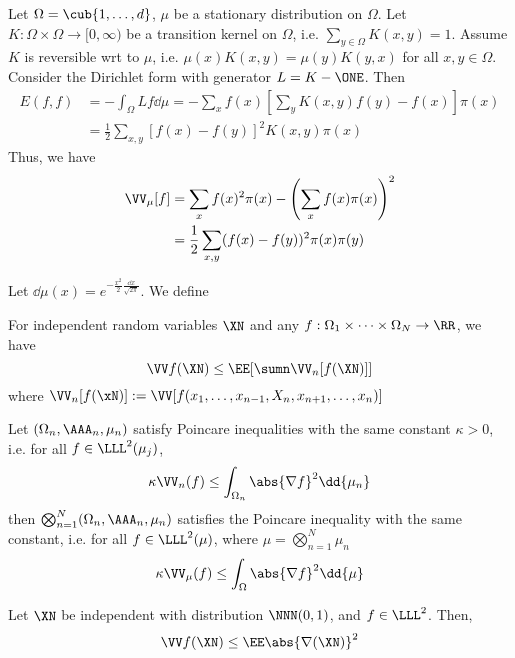 \begin{exm}
    Let $\Omega = \cub{1,\dots, d}$, $\mu$ be a stationary distribution on $\Omega$. Let $K:\Omega \times \Omega \to [0,\infty)$ be a transition kernel on $\Omega$, i.e. $\sum_{y\in \Omega}K(x,y)=1$. Assume $K$ is reversible wrt to $\mu$, i.e. $\mu(x)K(x,y) = \mu(y)K(y,x)$ for all $x,y \in \Omega$. Consider the Dirichlet form with generator $L=K-\ONE$. Then
    \begin{align*}
        E(f,f) &= -\int_\Omega Lf \dd{\mu} = - \sum_{x} f(x) \left[\sum_{y}K(x,y) f(y)-f(x)\right] \pi(x) \\
        &=\frac{1}{2} \sum_{x,y} \left[f(x)-f(y)\right]^2 K(x,y)\pi(x)
    \end{align*}
    Thus, we have 
    \begin{align*}
        \VV_\mu[f] &=\sum_x f(x)^2 \pi(x) - \left(\sum_x f(x) \pi(x)\right)^2 \\
        &= \frac{1}{2} \sum_{x,y} (f(x)-f(y))^2 \pi(x)\pi(y)
    \end{align*}
\end{exm}


\begin{exm}
    Let $\dd{\mu(x)} = e^{-\frac{x^2}{2}\frac{\dd{x}}{\sqrt{2\pi}}}$. We define 
\end{exm}


\begin{thm}
    For independent random variables $\XN$ and any $f: \Omega_1 \times \dots \times \Omega_N \to \RR$, we have 
    $$\VV f(\XN) \leq \EE[\sumn  \VV_n[f(\XN)]]$$
    where $\VV_n[f(\xN)]:= \VV[f(x_1,\dots,x_{n-1},X_n,x_{n+1}, \dots ,x_n)]$
\end{thm}


\begin{thm}
    Let $(\Omega_n,\AAA_n, \mu_n)$ satisfy Poincare inequalities with the same constant $\kappa>0$, i.e. for all $f\in \LLL^2(\mu_j)$, 
    $$\kappa \VV_n(f) \leq \int_{\Omega_n} \abs{\nabla f}^2 \dd{\mu_n}$$
    then $\bigotimes_{n=1}^N (\Omega_n, \AAA_n, \mu_n)$ satisfies the Poincare inequality with the same constant, i.e. for all $f\in \LLL^2(\mu)$, where $\mu=\bigotimes_{n=1}^N \mu_n$
    $$\kappa \VV_{\mu}(f) \leq \int_\Omega \abs{\nabla f}^2 \dd{\mu}$$
\end{thm}


\begin{exm}
    Let $\XN$ be independent with distribution $\NNN(0,1)$, and $f\in \LLL^2$. Then, 
    $$\VV f(\XN) \leq \EE\abs{\nabla(\XN)}^2$$
\end{exm}